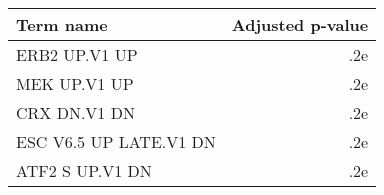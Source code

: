 \begin{tabular}{lr}
\toprule
             Term name &  Adjusted p-value \\
\midrule
         ERB2 UP.V1 UP &               .2e \\
          MEK UP.V1 UP &               .2e \\
          CRX DN.V1 DN &               .2e \\
ESC V6.5 UP LATE.V1 DN &               .2e \\
       ATF2 S UP.V1 DN &               .2e \\
\bottomrule
\end{tabular}
